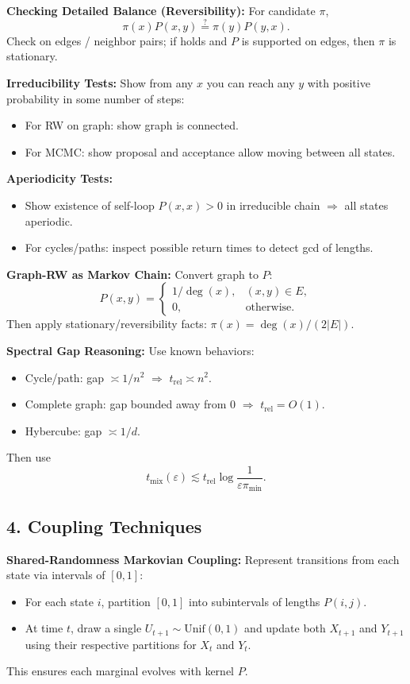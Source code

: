 \documentclass[answers,12pt,addpoints]{exam}
\begin{document}
\textbf{Checking Detailed Balance (Reversibility):}
For candidate $\pi$,
\[
\pi(x)P(x,y) \stackrel{?}{=} \pi(y)P(y,x).
\]
Check on edges / neighbor pairs; if holds and $P$ is supported on edges, then $\pi$ is stationary.

\textbf{Irreducibility Tests:}
Show from any $x$ you can reach any $y$ with positive probability in some number of steps:
\begin{itemize}
\item For RW on graph: show graph is connected.
\item For MCMC: show proposal and acceptance allow moving between all states.
\end{itemize}

\textbf{Aperiodicity Tests:}
\begin{itemize}
\item Show existence of self-loop $P(x,x)>0$ in irreducible chain $\Rightarrow$ all states aperiodic.
\item For cycles/paths: inspect possible return times to detect gcd of lengths.
\end{itemize}

\textbf{Graph-RW as Markov Chain:}
Convert graph to $P$:
\[
P(x,y)=\begin{cases}
1/\deg(x), & (x,y)\in E,\\
0, & \text{otherwise}.
\end{cases}
\]
Then apply stationary/reversibility facts: $\pi(x)=\deg(x)/(2|E|)$.

\textbf{Spectral Gap Reasoning:}
Use known behaviors:
\begin{itemize}
\item Cycle/path: gap $\asymp 1/n^2$ $\Rightarrow$ $t_{\mathrm{rel}}\asymp n^2$.
\item Complete graph: gap bounded away from 0 $\Rightarrow$ $t_{\mathrm{rel}}=O(1)$.
\item Hybercube: gap $\asymp 1/d$.
\end{itemize}
Then use
\[
t_{\mathrm{mix}}(\varepsilon)\lesssim t_{\mathrm{rel}}\log\frac{1}{\varepsilon\pi_{\min}}.
\]

\subsection*{4. Coupling Techniques}

\textbf{Shared-Randomness Markovian Coupling:}
Represent transitions from each state via intervals of $[0,1]$:
\begin{itemize}
\item For each state $i$, partition $[0,1]$ into subintervals of lengths $P(i,j)$.
\item At time $t$, draw a single $U_{t+1}\sim\mathrm{Unif}(0,1)$ and update both $X_{t+1}$ and $Y_{t+1}$ using their respective partitions for $X_t$ and $Y_t$.
\end{itemize}
This ensures each marginal evolves with kernel $P$.
\end{document}
